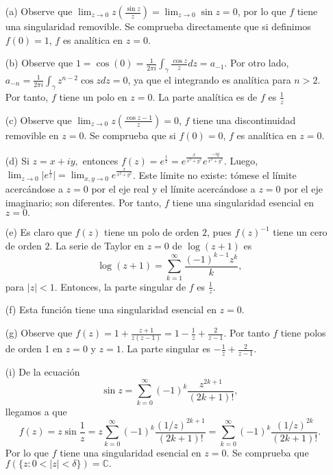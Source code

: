 \documentclass[12pt]{article}
\newcommand{\C}{\mathbb{C}}
\begin{document}
\begin{itemize}
    \item[(a)] Observe que $\lim_{z \to 0} z \left( \frac{\sin z}{z} \right) = \lim_{z \to 0} \sin z = 0$, por lo que $f$ tiene una singularidad removible. Se comprueba directamente que si definimos $f(0)  = 1$, $f$ es analítica en $z=0$.
    
    \item[(b)] Observe que $1 = \cos(0) = \frac{1}{2 \pi i} \int_\gamma \frac{\cos z}{z} dz = a_{-1}.$ Por otro lado, $a_{-n} = \frac{1}{2\pi i} \int_\gamma z^{n - 2} \cos z dz  = 0$, ya que el integrando es analítica para $n > 2$. Por tanto, $f$ tiene un polo en $z=0.$ La parte analítica es de $f$ es $\frac{1}{z}$
    
    \item[(c)] Observe que $\lim_{z \to 0} z \left( \frac{\cos z - 1}{z} \right) = 0$, $f$ tiene una discontinuidad removible en $z = 0.$ Se comprueba que si $f(0) = 0$, $f$ es analítica en $z=0$.
    
    \item[(d)] Si $z = x + i y,$ entonces $f(z) = e^{\frac{1}{z}} = e^{\frac{x}{x^2 + y^2}} e^{\frac{-iy}{x^2 + y^2}}.$ Luego, $\lim_{z \to 0} \lvert e^{\frac{1}{z}} \rvert = \lim_{x,y \to 0} e^{\frac{x}{x^2 + y^2}}$. Este límite no existe: tómese el límite acercándose a $z=0$ por el  eje real y el límite acercándose a $z=0$ por el eje imaginario; son diferentes. Por tanto, $f$ tiene una singularidad esencial en $z=0.$
    
    \item[(e)] Es claro que $f(z)$ tiene un polo de orden $2$, pues $f(z)^{-1}$ tiene un cero de orden $2$. La serie de Taylor en $z=0$ de $\log(z+1)$ es
    $$
    \log(z+1) = \sum_{k=1}^\infty \frac{(-1)^{k-1} z^k}{k},
    $$
    para $\lvert z \rvert < 1$. Entonces, la parte singular de $f$ es
    $\frac{1}{z}$.
    
    \item[(f)] Esta función tiene una singularidad esencial en $z=0.$

    \item[(g)] Observe que $f(z) = 1 + \frac{z+1}{z(z-1)} = 1-\frac{1}{z}+\frac{2}{z-1}$. Por tanto $f$ tiene polos de orden 1 en $z=0$ y $z=1.$ La parte singular es $-\frac{1}{z}+\frac{2}{z-1}.$
    
    \item[(i)] De la ecuación 
    $$\sin z = \sum_{k=0}^\infty (-1)^k \frac{z^{2k+1}}{(2k+1)!},$$
    llegamos a que 
    $$f(z) = z \sin \frac{1}{z} = z \sum_{k=0}^\infty (-1)^k \frac{(1/z)^{2k+1}}{(2k+1)!} = \sum_{k=0}^\infty (-1)^k \frac{(1/z)^{2k}}{(2k+1)!}.$$
    Por lo que $f$ tiene una singularidad esencial en $z=0.$ Se comprueba que $f(\{z: 0 < \lvert z \rvert < \delta \}) = \C.$
\end{itemize}
\end{document}
